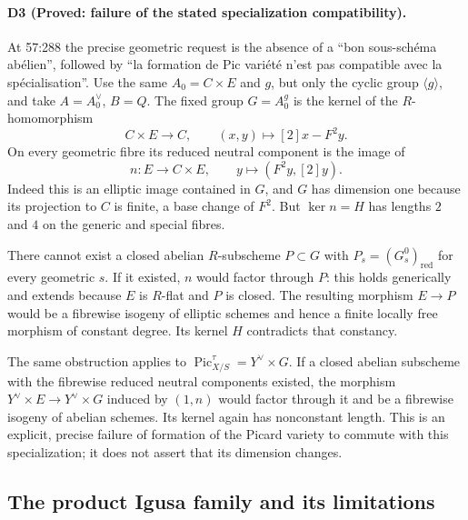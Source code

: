 \paragraph{D3 (Proved: failure of the stated specialization compatibility).}
At 57:288 the precise geometric request is the absence of a
``bon sous-schéma abélien'', followed by
``la formation de Pic variété n'est pas compatible avec la spécialisation''.
Use the same $A_0=C\times E$ and $g$, but only the cyclic group
$\langle g\rangle$, and take $A=A_0^\vee$, $B=Q$.  The fixed group
$G=A_0^g$ is the kernel of the $R$-homomorphism
\[
 C\times E\longrightarrow C,\qquad (x,y)\longmapsto[2]x-F^2y.
\]
On every geometric fibre its reduced neutral component is the image
of
\[
 n:E\longrightarrow C\times E,\qquad y\longmapsto(F^2y,[2]y).
\]
Indeed this is an elliptic image contained in $G$, and $G$ has
dimension one because its projection to $C$ is finite, a base change
of $F^2$.  But $\ker n=H$ has lengths $2$ and $4$ on the generic and
special fibres.

There cannot exist a closed abelian $R$-subscheme $P\subset G$ with
$P_s=(G_s^0)_{\mathrm{red}}$ for every geometric $s$.  If it existed,
$n$ would factor through $P$: this holds generically and extends
because $E$ is $R$-flat and $P$ is closed.  The resulting morphism
$E\to P$ would be a fibrewise isogeny of elliptic schemes and hence a
finite locally free morphism of constant degree.  Its kernel $H$
contradicts that constancy.

The same obstruction applies to
$\operatorname{Pic}^{\tau}_{X/S}=Y^\vee\times G$.  If a closed abelian
subscheme with the fibrewise reduced neutral components existed,
the morphism $Y^\vee\times E\to Y^\vee\times G$ induced by $(1,n)$
would factor through it and be a fibrewise isogeny of abelian schemes.
Its kernel again has nonconstant length.  This is an explicit, precise
failure of formation of the Picard variety to commute with this
specialization; it does not assert that its dimension changes.

\subsection{The product Igusa family and its limitations}
